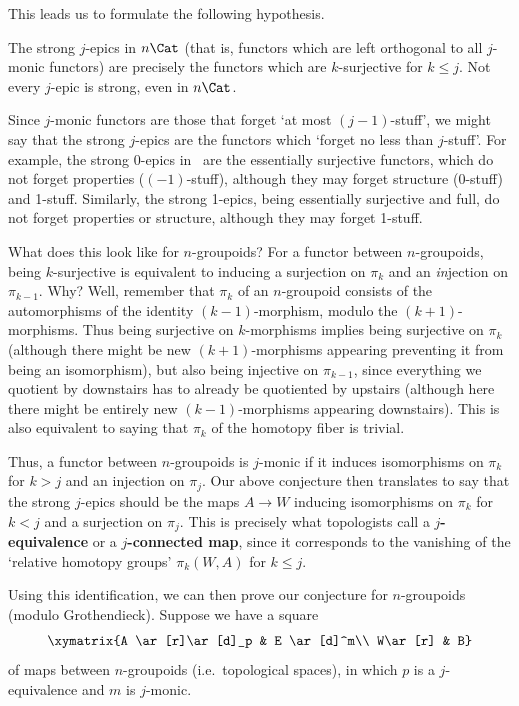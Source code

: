 \documentclass{amsart}
\begin{document}
This leads us to formulate the following hypothesis.

\begin{hyp} \label{epimono}
  The strong $j$-epics in $n\Cat$ (that is, functors which are left
  orthogonal to all $j$-monic functors) are precisely the functors
  which are $k$-surjective for $k\le j$.  Not every $j$-epic is
  strong, even in $n\Cat$.
\end{hyp}

Since $j$-monic functors are those that forget `at most
$(j-1)$-stuff', we might say that the strong $j$-epics are the
functors which `forget no less than $j$-stuff'.  For example, the
strong 0-epics in \Cat\ are the essentially surjective functors, which
do not forget properties ($(-1)$-stuff), although they may forget
structure (0-stuff) and 1-stuff.  Similarly, the strong 1-epics, being
essentially surjective and full, do not forget properties or
structure, although they may forget 1-stuff.

What does this look like for $n$-groupoids?  For a functor between
$n$-groupoids, being $k$-surjective is equivalent to inducing a
surjection on $\pi_k$ and an \emph{in}jection on $\pi_{k-1}$.  Why?
Well, remember that $\pi_k$ of an $n$-groupoid consists of the
automorphisms of the identity $(k-1)$-morphism, modulo the
$(k+1)$-morphisms.  Thus being surjective on $k$-morphisms implies
being surjective on $\pi_k$ (although there might be new
$(k+1)$-morphisms appearing preventing it from being an isomorphism),
but also being injective on $\pi_{k-1}$, since everything we quotient
by downstairs has to already be quotiented by upstairs (although here
there might be entirely new $(k-1)$-morphisms appearing downstairs).
This is also equivalent to saying that $\pi_k$ of the homotopy fiber
is trivial.

Thus, a functor between $n$-groupoids is $j$-monic if it induces
isomorphisms on $\pi_k$ for $k > j$ and an injection on $\pi_{j}$.
Our above conjecture then translates to say that the strong $j$-epics
should be the maps $A\to W$ inducing isomorphisms on $\pi_k$ for $k<j$
and a surjection on $\pi_{j}$.  This is precisely what topologists
call a \textbf{$j$-equivalence} or a \textbf{$j$-connected map},
since it corresponds to the vanishing of the `relative homotopy
groups' $\pi_k(W,A)$ for $k\le j$.

Using this identification, we can then prove our conjecture for
$n$-groupoids (modulo Grothendieck).  Suppose we have a square
\[\xymatrix{A \ar[r]\ar[d]_p & E \ar[d]^m\\
  W\ar[r] & B}\]
of maps between $n$-groupoids (i.e.\ topological spaces), in which $p$
is a $j$-equivalence and $m$ is $j$-monic.
\end{document}
